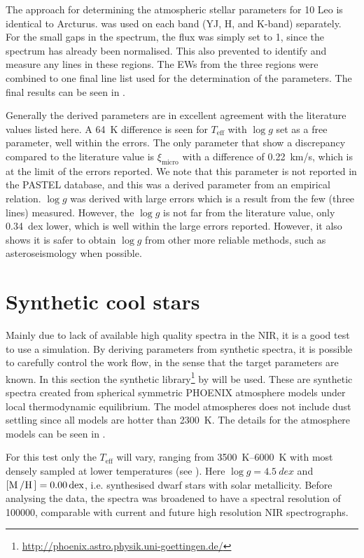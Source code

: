 The approach for determining the atmospheric stellar parameters for 10 Leo is identical to Arcturus.
 was used on each band (YJ, H, and K-band) separately. For the small gaps in the
spectrum, the flux was simply set to 1, since the spectrum has already been normalised. This also
prevented  to identify and measure any lines in these regions. The EWs from the three
regions were combined to one final line list used for the determination of the parameters. The final
results can be seen in .

Generally the derived parameters are in excellent agreement with the literature values listed here.
A \SI{64}{K} difference is seen for $T_\mathrm{eff}$ with $\log g$ set as a free parameter, well
within the errors. The only parameter that show a discrepancy compared to the literature value is
$\xi_\mathrm{micro}$ with a difference of \SI{0.22}{km/s}, which is at the limit of the errors
reported. We note that this parameter is not reported in the PASTEL database, and this was a derived parameter from an empirical relation. $\log g$
was derived with large errors which is a result from the few  (three lines) measured.
However, the $\log g$ is not far from the literature value, only \SI{0.34}{dex} lower, which is well
within the large errors reported. However, it also shows it is safer to obtain $\log g$ from other
more reliable methods, such as asteroseismology when possible.


\section{Synthetic cool stars}
\label{sec:synthetic_spectra}

Mainly due to lack of available high quality spectra in the NIR, it is a good test to use a
simulation. By deriving parameters from synthetic spectra, it is possible to carefully control the
work flow, in the sense that the target parameters are known. In this section the synthetic
library\footnote{\url{http://phoenix.astro.physik.uni-goettingen.de/}} by \citet{Husser2013} will be
used. These are synthetic spectra created from spherical symmetric PHOENIX atmosphere models under
local thermodynamic equilibrium. The model atmospheres does not include dust settling since all
models are hotter than \SI{2300}{K}. The details for the atmosphere models can be seen in
\citet{Husser2013}.

For this test only the $T_\mathrm{eff}$ will vary, ranging from \SIrange{3500}{6000}{K} with
most densely sampled at lower temperatures (see ). Here $\log
g=\SI{4.5}{dex}$ and $[\ion{M}/\ion{H}]=\SI{0.00}{dex}$, i.e. synthesised dwarf stars with solar
metallicity. Before analysing the data, the spectra was broadened to have a spectral resolution of
\num{100000}, comparable with current and future high resolution NIR spectrographs.

